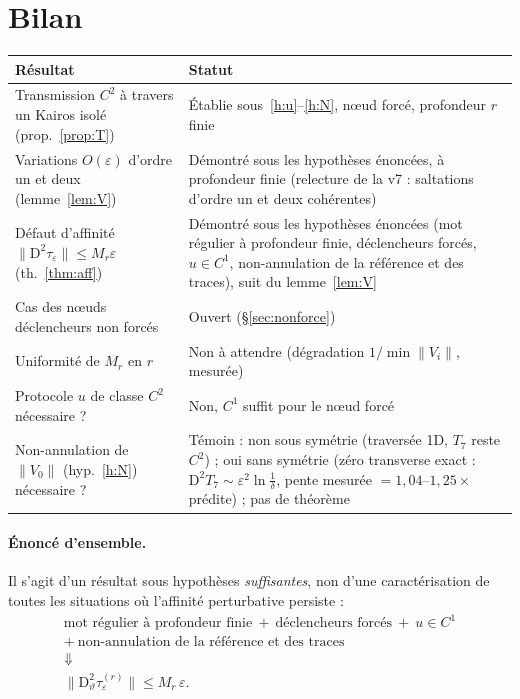 \documentclass[11pt,a4paper]{article}
\theoremstyle{remark}
\theoremstyle{definition}
\newcommand{\norm}[1]{\lVert #1\rVert}
\newcommand{\eps}{\varepsilon}
\newcommand{\vth}{\vartheta}
\newcommand{\D}{\mathrm D}
\begin{document}
\section{Bilan}

\begin{center}
\begin{tabular}{p{}p{}}
\toprule
Résultat & Statut\\
\midrule
Transmission $C^2$ à travers un Kairos isolé (prop.~\ref{prop:T}) & Établie sous~\ref{h:u}--\ref{h:N}, n\oe ud forcé, profondeur $r$ finie\\
Variations $O(\eps)$ d'ordre un et deux (lemme~\ref{lem:V}) & Démontré sous les hypothèses énoncées, à profondeur finie (relecture de la v7 : saltations d'ordre un et deux cohérentes)\\
Défaut d'affinité $\norm{\D^2\tau_\eps}\le M_r\eps$ (th.~\ref{thm:aff}) & Démontré sous les hypothèses énoncées (mot régulier à profondeur finie, déclencheurs forcés, $u\in C^1$, non-annulation de la référence et des traces), suit du lemme~\ref{lem:V}\\
Cas des n\oe uds déclencheurs non forcés & Ouvert (§\ref{sec:nonforce})\\
Uniformité de $M_r$ en $r$ & Non à attendre (dégradation $1/\min\norm{V_i}$, mesurée)\\
Protocole $u$ de classe $C^2$ nécessaire ? & Non, $C^1$ suffit pour le n\oe ud forcé\\
Non-annulation de $\norm{V_0}$ (hyp.~\ref{h:N}) nécessaire ? & Témoin : non sous symétrie (traversée 1D, $T_7$ reste $C^2$) ; oui sans symétrie (zéro transverse exact : $\D^2T_7\sim\eps^2\ln\frac1\delta$, pente mesurée $=1{,}04$--$1{,}25\times$ prédite) ; pas de théorème\\
\bottomrule
\end{tabular}
\end{center}

\paragraph{Énoncé d'ensemble.} Il s'agit d'un résultat sous hypothèses \emph{suffisantes}, non d'une caractérisation de toutes les situations où l'affinité perturbative persiste :
\[
\boxed{\ \begin{gathered}
\text{mot régulier à profondeur finie}\ +\ \text{déclencheurs forcés}\ +\ u\in C^1\\
+\ \text{non-annulation de la référence et des traces}\\
\Downarrow\\
\norm{\D_\vth^2\tau_\eps^{(r)}}\le M_r\,\eps .
\end{gathered}\ }
\]
\end{document}
